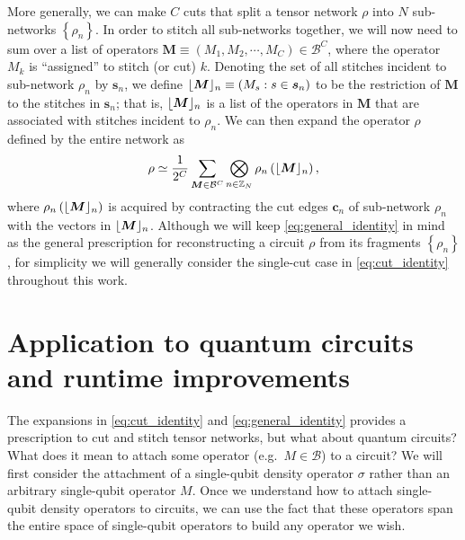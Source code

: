 \documentclass[nofootinbib,notitlepage,11pt]{revtex4-2}
\newcommand{\f}[2]{\dfrac{#1}{#2}} %
\newcommand{\p}[1]{\left(#1\right)} %
\renewcommand{\set}[1]{\left\{#1\right\}} %
\renewcommand{\v}{\bm} %
\newcommand{\B}{\mathcal{B}}
\newcommand{\Z}{\mathbb{Z}}
\DeclarePairedDelimiter\floor{\lfloor}{\rfloor}
\begin{document}
More generally, we can make $C$ cuts that split a tensor network
$\rho$ into $N$ sub-networks $\set{\rho_n}$.  In order to stitch all
sub-networks together, we will now need to sum over a list of
operators $\v M\equiv\p{M_1,M_2,\cdots,M_C}\in\B^C$, where the
operator $M_k$ is ``assigned'' to stitch (or cut) $k$.  Denoting the
set of all stitches incident to sub-network $\rho_n$ by $\v s_n$, we
define $\floor{\v M}_n\equiv\p{M_s:s\in\v s_n}$ to be the restriction
of $\v M$ to the stitches in $\v s_n$; that is, $\floor{\v M}_n$ is a
list of the operators in $\v M$ that are associated with stitches
incident to $\rho_n$.  We can then expand the operator $\rho$ defined
by the entire network as
\begin{align}
  \rho \simeq \f1{2^C} \sum_{\v M\in\B^C}
  \bigotimes_{n\in\Z_N} \rho_n\p{\floor{\v M}_n},
  \label{eq:general_identity}
\end{align}
where $\rho_n\p{\floor{\v M}_n}$ is acquired by contracting the cut
edges $\v c_n$ of sub-network $\rho_n$ with the vectors in
$\floor{\v M}_n$.  Although we will keep \eqref{eq:general_identity}
in mind as the general prescription for reconstructing a circuit
$\rho$ from its fragments $\set{\rho_n}$, for simplicity we will
generally consider the single-cut case in \eqref{eq:cut_identity}
throughout this work.


\section{Application to quantum circuits and runtime improvements}
\label{sec:circuits}

The expansions in \eqref{eq:cut_identity} and
\eqref{eq:general_identity} provides a prescription to cut and stitch
tensor networks, but what about quantum circuits?  What does it mean
to attach some operator (e.g.~$M\in\B$) to a circuit?  We will first
consider the attachment of a single-qubit density operator $\sigma$
rather than an arbitrary single-qubit operator $M$.  Once we
understand how to attach single-qubit density operators to circuits,
we can use the fact that these operators span the entire space of
single-qubit operators to build any operator we wish.
\end{document}
